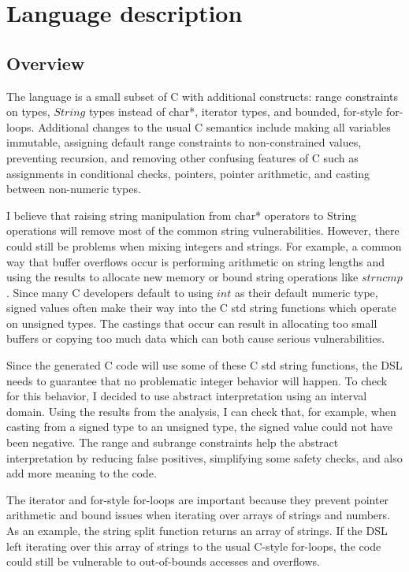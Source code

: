 \documentclass[letterpaper]{article}
\begin{document}
\section{Language description}


\subsection{Overview}

The language is a small subset of C with
additional constructs: range constraints on types, $String$ types instead
of char*, iterator types, and bounded, for-style for-loops. Additional changes
to the usual C semantics include making all variables immutable, assigning
default range constraints to non-constrained values, preventing recursion,
and removing  other confusing features of C such as assignments in conditional
checks, pointers, pointer arithmetic, and casting between non-numeric types.

I believe that raising string manipulation from char* operators to String
operations will remove most of the common string vulnerabilities. However,
there could still be problems when mixing integers and strings. For example,
a common way that buffer overflows occur is performing arithmetic on string
lengths and using the results to allocate new memory or bound string operations
like $strncmp$. Since many C developers default to using $int$ as their default
numeric type, signed values often make their way into the C std string functions
which operate on unsigned types. The castings that occur can result in allocating
too small buffers or copying too much data which can both cause serious vulnerabilities.

Since the generated C code will use some of these C std string functions, the DSL
needs to guarantee that no problematic integer behavior will happen. To check for
this behavior, I decided to use abstract interpretation using an interval domain.
Using the results from the analysis, I can check that, for example, when casting
from a signed type to an unsigned type, the signed value could not have been negative.
The range and subrange constraints help the abstract interpretation by reducing false
positives, simplifying some safety checks, and also add more meaning to the code.

The iterator and for-style for-loops are important because they prevent pointer
arithmetic and bound issues when iterating over arrays of strings and numbers.
As an example, the string split function returns an array of strings. If the DSL
left iterating over this array of strings to the usual C-style for-loops, the
code could still be vulnerable to out-of-bounds accesses and overflows. 
\end{document}
